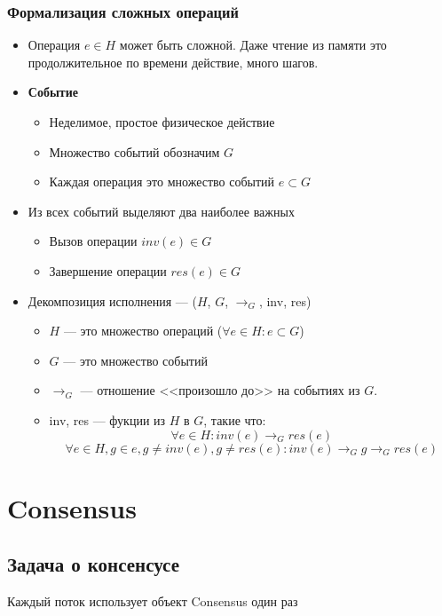 \documentclass[10pt,a4paper,oneside,titlepage]{article}
\theoremstyle{plain}
\theoremstyle{defenition}
\begin{document}
\subsubsection{Формализация сложных операций}
\begin{itemize}
	\item Операция $e\in H$ может быть сложной. Даже чтение из памяти это продолжительное по времени действие, много шагов.
	\item {\bfseries Событие}
	\begin{itemize}
		\item Неделимое, простое физическое действие
		\item Множество событий обозначим $G$
		\item Каждая операция это множество событий $e\subset G$
	\end{itemize}
    \item Из всех событий выделяют два наиболее важных
    \begin{itemize}
    	\item Вызов операции $inv(e)\in G$
    	\item Завершение операции $res(e)\in G$
    \end{itemize}
    \item Декомпозиция исполнения --- ($H$, $G$, $\to_G$, inv, res)
    \begin{itemize}
    	\item $H$ --- это множество операций ($\forall e\in H\colon e\subset G$)
    	\item $G$ --- это множество событий
    	\item $\to_G$ --- отношение <<произошло до>> на событиях из $G$.
    	\item inv, res --- фукции из $H$ в $G$, такие что:
    	$$
    	\forall e\in H\colon inv(e)\to_Gres(e)
    	$$
    	$$
    	\forall e\in H, g\in e, g\ne inv(e), g\ne res(e)\colon inv(e)\to_Gg\to_Gres(e)
    	$$
    \end{itemize}
\end{itemize}

\section{Consensus}
\subsection{Задача о консенсусе}

Каждый поток использует объект Consensus один раз
\end{document}

